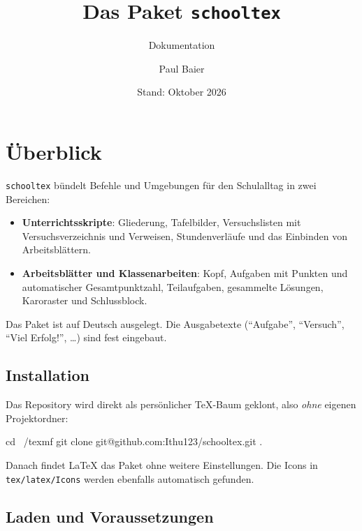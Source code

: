 \documentclass[a4paper,11pt,parskip=half]{scrartcl}
\title{Das Paket \texttt{schooltex}}
\subtitle{Dokumentation}
\author{Paul Baier}
\date{Stand: Oktober 2026}
\begin{document}
\maketitle
\tableofcontents

\section{Überblick}

\texttt{schooltex} bündelt Befehle und Umgebungen für den Schulalltag in zwei Bereichen:

\begin{itemize}
  \item \textbf{Unterrichtsskripte}: Gliederung, Tafelbilder, Versuchslisten mit
        Versuchsverzeichnis und Verweisen, Stundenverläufe und das Einbinden von Arbeitsblättern.
  \item \textbf{Arbeitsblätter und Klassenarbeiten}: Kopf, Aufgaben mit Punkten
        und automatischer Gesamtpunktzahl, Teilaufgaben, gesammelte Lösungen, Karoraster und
        Schlussblock.
\end{itemize}

Das Paket ist auf Deutsch ausgelegt. Die Ausgabetexte (\enquote{Aufgabe}, \enquote{Versuch},
\enquote{Viel Erfolg!}, \dots) sind fest eingebaut.

\subsection{Installation}

Das Repository wird direkt als persönlicher TeX-Baum geklont, also \emph{ohne} eigenen Projektordner:
\begin{code}
cd ~/texmf
git clone git@github.com:Ithu123/schooltex.git .
\end{code}
Danach findet \LaTeX{} das Paket ohne weitere Einstellungen. Die Icons in
\texttt{tex/latex/Icons} werden ebenfalls automatisch gefunden.

\subsection{Laden und Voraussetzungen}

\end{document}
